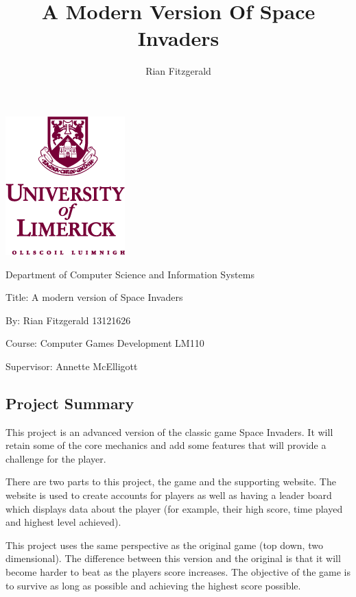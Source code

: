 \documentclass[12pt]{article}
\title{A Modern Version Of Space Invaders}
\author{Rian Fitzgerald}
\begin{document}
\newpage
\begin{center}
\section*{}
	\includegraphics[scale=1]{uni-limerick-crest.png}
	
	{\Large Department of Computer Science and Information Systems
	
	Title: A modern version of Space Invaders
	
	By: Rian Fitzgerald 13121626
	
	Course: Computer Games Development LM110
	
	Supervisor: Annette McElligott}
	
\end{center}
\newpage
{}
\begin{center}
\section*{Project Summary}
\end{center}
This project is an advanced version of the classic game Space Invaders. It will retain some of the core mechanics and add some features that will provide a challenge for the player. 

There are two parts to this project, the game and the supporting website. The website is used to create accounts for players as well as having a leader board which displays data about the player (for example, their high score, time played and highest level achieved). 

This project uses the same perspective as the original game (top down, two dimensional). The difference between this version and the original is that it will become harder to beat as the players score increases. The objective of the game is to survive as long as possible and achieving the highest score possible. 
\end{document}
